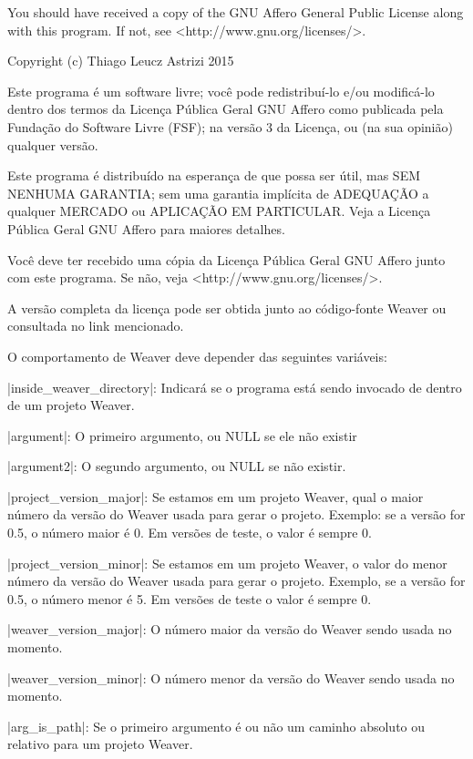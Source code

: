 You should have received a copy of the GNU Affero General Public
License along with this program.  If not, see
<http://www.gnu.org/licenses/>.

\linha

Copyright (c) Thiago Leucz Astrizi 2015

Este programa é um software livre; você pode redistribuí-lo e/ou
modificá-lo dentro dos termos da Licença Pública Geral GNU Affero como
publicada pela Fundação do Software Livre (FSF); na versão 3 da
Licença, ou (na sua opinião) qualquer versão.

Este programa é distribuído na esperança de que possa ser útil,
mas SEM NENHUMA GARANTIA; sem uma garantia implícita de ADEQUAÇÃO
a qualquer MERCADO ou APLICAÇÃO EM PARTICULAR. Veja a
Licença Pública Geral GNU Affero para maiores detalhes.

Você deve ter recebido uma cópia da Licença Pública Geral GNU Affero
junto com este programa. Se não, veja
<http://www.gnu.org/licenses/>.
\alinhanormal
\linha\espaco{5mm}

A versão completa da licença pode ser obtida junto ao código-fonte
Weaver ou consultada no link mencionado.


O comportamento de Weaver deve depender das seguintes variáveis:

|inside_weaver_directory|: Indicará se o programa está sendo
  invocado de dentro de um projeto Weaver.

|argument|: O primeiro argumento, ou NULL se ele não existir

|argument2|: O segundo argumento, ou NULL se não existir.

|project_version_major|: Se estamos em um projeto Weaver, qual o
  maior número da versão do Weaver usada para gerar o
  projeto. Exemplo: se a versão for 0.5, o número maior é 0. Em
  versões de teste, o valor é sempre 0.

|project_version_minor|: Se estamos em um projeto Weaver, o valor
  do menor número da versão do Weaver usada para gerar o
  projeto. Exemplo, se a versão for 0.5, o número menor é 5. Em
  versões de teste o valor é sempre 0.

|weaver_version_major|: O número maior da versão do Weaver sendo
  usada no momento.

|weaver_version_minor|: O número menor da versão do Weaver sendo
  usada no momento.

|arg_is_path|: Se o primeiro argumento é ou não um caminho
  absoluto ou relativo para um projeto Weaver.

